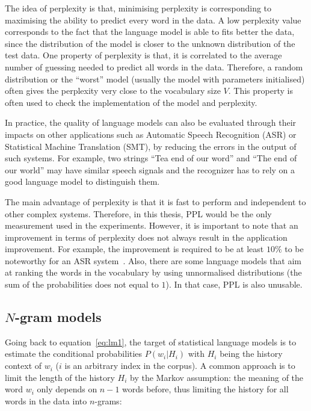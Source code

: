 The idea of perplexity is that, minimising perplexity is corresponding to maximising the ability to predict every word in the data. A low perplexity value corresponds to the fact that the language model is able to fits better the data, since the distribution of the model is closer to the unknown distribution of the test data. One property of perplexity is that, it is correlated to the average number of guessing needed to predict all words in the data. Therefore, a random distribution or the ``worst'' model (usually the model with parameters initialised) often gives the perplexity very close to the vocabulary size $V$. This property is often used to check the implementation of the model and perplexity. 

In practice, the quality of language models can also be evaluated through their impacts on other applications such as Automatic Speech Recognition (ASR) or Statistical Machine Translation (SMT), by reducing the errors in the output of such systems. For example, two strings ``Tea end of our word'' and ``The end of our world'' may have similar speech signals and the recognizer has to rely on a good language model to distinguish them. 

The main advantage of perplexity is that it is fast to perform and independent to other complex systems. Therefore, in this thesis, PPL would be the only measurement used in the experiments. However, it is important to note that an improvement in terms of perplexity does not always result in the application improvement. For example, the improvement is required to be at least $10\%$ to be noteworthy for an ASR system~\cite{Rosenfeld:2000}. Also, there are some language models that aim at ranking the words in the vocabulary by using unnormalised distributions (the sum of the probabilities does not equal to $1$). In that case, PPL is also unusable. 


\subsection{$N$-gram models}

Going back to equation~\ref{eq:lm1}, the target of statistical language models is to estimate the conditional probabilities $P(w_i|H_i)$ with $H_i$ being the history context of $w_i$ ($i$ is an arbitrary index in the corpus). A common approach is to limit the length of the history $H_i$ by the Markov assumption: the meaning of the word $w_i$ only depends on $n-1$ words before, thus limiting the history for all words in the data into $n$-grams:

